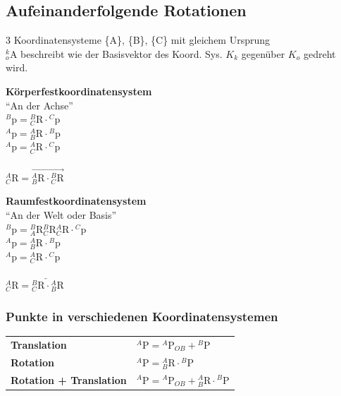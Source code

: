 \subsection{Aufeinanderfolgende Rotationen}
3 Koordinatensysteme \{A\}, \{B\}, \{C\} mit gleichem Ursprung\\
${}^k_o\mathrm{A}$ beschreibt wie der Basisvektor des Koord. Sys. $K_k$ gegenüber $K_o$ gedreht wird.\newline
\begin{minipage}{6cm}
    \textbf{Körperfestkoordinatensystem}\\
    "`An der Achse"'\\
    ${}^B\mathrm{p}={}^B_C\mathrm{R}\cdot{}^C\mathrm{p}$\\
    ${}^A\mathrm{p}={}^A_B\mathrm{R}\cdot{}^B\mathrm{p}$\\
    ${}^A\mathrm{p}={}^A_C\mathrm{R}\cdot{}^C\mathrm{p}$\\ \\
    ${}^A_C\mathrm{R}=\overrightarrow{{}^A_B\mathrm{R} \cdot {}^B_C\mathrm{R}}$\\
\end{minipage}
\begin{minipage}{6cm}
    \textbf{Raumfestkoordinatensystem}\\ 
    "`An der Welt oder Basis"'\\
    ${}^B\mathrm{p}={}^B_A\mathrm{R}{}^B_C\mathrm{R}{}^A_C\mathrm{R}\cdot{}^C\mathrm{p}$\\
    ${}^A\mathrm{p}={}^A_B\mathrm{R}\cdot{}^B\mathrm{p}$\\
    ${}^A\mathrm{p}={}^A_C\mathrm{R}\cdot{}^C\mathrm{p}$\\ \\
    ${}^A_C\mathrm{R}=\overleftarrow{{}^B_C\mathrm{R} \cdot {}^A_B\mathrm{R}}$\\
\end{minipage}   

\subsubsection{Punkte in verschiedenen Koordinatensystemen }
\begin{tabular}{ll}
    \textbf{Translation}&${}^A\mathrm{P} = {}^A\mathrm{P}_{OB}+{}^B\mathrm{P} $ \\
    \textbf{Rotation} & ${}^A\mathrm{P} = {}^A_B\mathrm{R}\cdot {}^B\mathrm{P} $\\
    \textbf{Rotation + Translation}&$ {}^A\mathrm{P} = {}^A\mathrm{P}_{OB} +{}^A_B\mathrm{R}\cdot {}^B\mathrm{P} $\\
\end{tabular}
\clearpage


